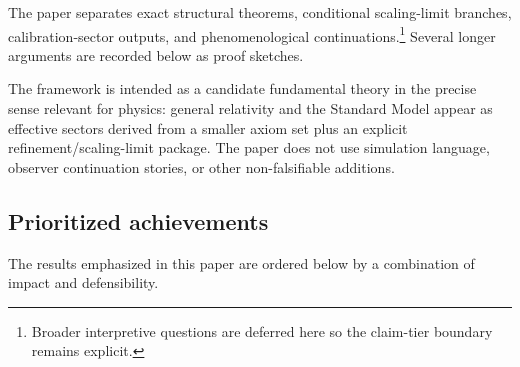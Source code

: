 \documentclass[11pt]{article}
\begin{document}
The paper separates exact structural theorems, conditional scaling-limit branches, calibration-sector outputs, and phenomenological continuations.\footnote{Broader interpretive questions are deferred here so the claim-tier boundary remains explicit.} Several longer arguments are recorded below as proof sketches.

The framework is intended as a candidate fundamental theory in the precise sense relevant for physics: general relativity and the Standard Model appear as effective sectors derived from a smaller axiom set plus an explicit refinement/scaling-limit package. The paper does not use simulation language, observer continuation stories, or other non-falsifiable additions.

\subsection*{Prioritized achievements}

The results emphasized in this paper are ordered below by a combination of impact and defensibility.
\end{document}
